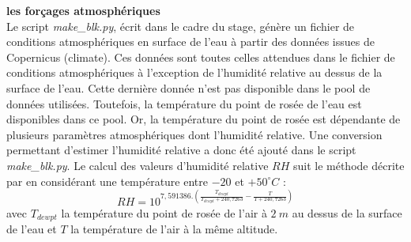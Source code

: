 \documentclass[10pt,a4paper,titlepage]{article}
\begin{document}



\textbf{les forçages atmosphériques}\\
\label{par:forcages_atm}
Le script \textit{make\_blk.py}, écrit dans le cadre du stage, génère un fichier de conditions atmosphériques en surface de l'eau à partir des données issues de Copernicus (climate).
Ces données sont toutes celles attendues dans le fichier de conditions atmosphériques à l'exception de l'humidité relative au dessus de la surface de l'eau. Cette dernière donnée n'est pas disponible dans le pool de données utilisées.
Toutefois, la température du point de rosée de l'eau est disponibles dans ce pool.
Or, la température du point de rosée est dépendante de plusieurs paramètres atmosphériques dont l'humidité relative.
Une conversion permettant d'estimer l'humidité relative a donc été ajouté dans le script \textit{make\_blk.py}.
Le calcul des valeurs d'humidité relative $RH$ suit le méthode décrite par \cite{humidity_formulation} en considérant une température entre $-20$ et $+50 ^\circ C$ :
$$RH = 10^{7,591386.(\frac{T_{dewpt}}{T_{dewpt}+240,7263}-\frac{T}{T+240,7263})}$$
avec $T_{dewpt}$ la température du point de rosée de l'air à $2~m$ au dessus de la surface de l'eau et $T$ la température de l'air à la même altitude.
\end{document}
